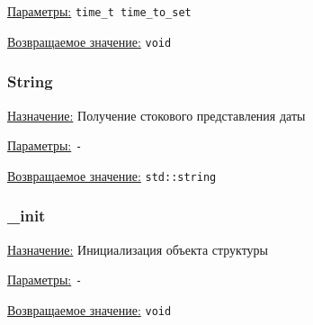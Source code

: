 \underline{Параметры:} \verb|time_t time_to_set|

\underline{Возвращаемое значение:} \verb|void|


\subsubsection{String}

\underline{Назначение:} Получение стокового представления даты

\underline{Параметры:} \verb|-|

\underline{Возвращаемое значение:} \verb|std::string|


\subsubsection{\_init}

\underline{Назначение:} Инициализация объекта структуры

\underline{Параметры:} \verb|-|

\underline{Возвращаемое значение:} \verb|void|

